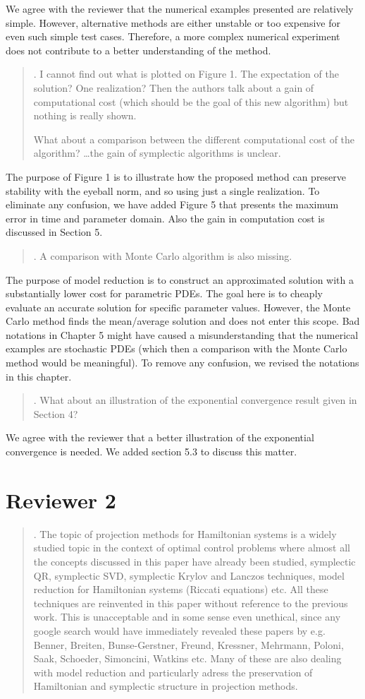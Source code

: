 \documentclass[a4paper]{article}
\newcommand{\breview}{\begin{quotation}\begin{bf}\noindent}
\newcommand{\ereview}{\end{bf}\end{quotation}}
\begin{document}
We agree with the reviewer that the numerical examples presented are relatively simple. However, alternative methods are either unstable or too expensive for even such simple test cases. Therefore, a more complex numerical experiment does not contribute to a better understanding of the method. 


\breview
4. I cannot find out what is plotted on Figure 1. The expectation of the solution? One realization? Then the authors talk about a gain of computational cost (which should be the goal of this new algorithm) but nothing is really shown. 

What about a comparison between the different computational cost of the algorithm? \dots the gain of symplectic algorithms is unclear. 
\ereview

The purpose of Figure 1 is to illustrate how the proposed method can preserve stability with the eyeball norm, and so using just a single realization. To eliminate any confusion, we have added Figure 5 that presents the maximum error in time and parameter domain. Also the gain in computation cost is discussed in Section 5.

\breview
5. A comparison with Monte Carlo algorithm is also missing.  
\ereview

The purpose of model reduction is to construct an approximated solution with a substantially lower cost for parametric PDEs. The goal here is to cheaply evaluate an accurate solution for specific parameter values. However, the Monte Carlo method finds the mean/average solution and does not enter this scope. Bad notations in Chapter 5 might have caused a misunderstanding that the numerical examples are stochastic PDEs (which then a comparison with the Monte Carlo method would be meaningful). To remove any confusion, we revised the notations in this chapter.

\breview
6. What about an illustration of the exponential convergence result given in Section 4? 
\ereview

We agree with the reviewer that a better illustration of the exponential convergence is needed. We added section 5.3 to discuss this matter.

\section*{Reviewer 2}

\breview
1. The topic of projection methods for Hamiltonian systems is a widely studied topic in the context of optimal control problems where almost all the concepts discussed in this paper have already been studied, symplectic QR, symplectic SVD, symplectic Krylov and Lanczos techniques, model reduction for Hamiltonian systems (Riccati equations) etc. All these techniques are reinvented in this paper without reference to the previous work. This is unacceptable and in some sense even unethical, since any google search would have immediately revealed these papers by e.g. Benner, Breiten, Bunse-Gerstner, Freund, Kressner, Mehrmann, Poloni, Saak, Schoeder, Simoncini, Watkins etc. Many of these are also dealing with model reduction and particularly adress the preservation of Hamiltonian and symplectic structure in projection methods.
\ereview
\end{document}
